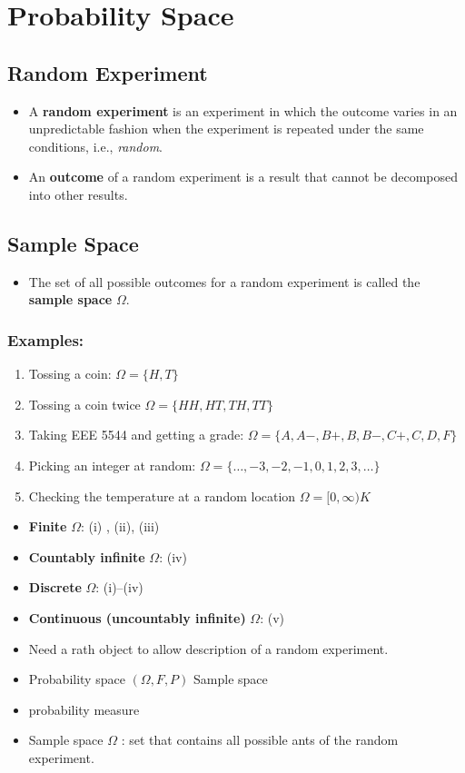 \section{Probability Space}

\subsection{Random Experiment}
\begin{itemize}
\item A \textbf{random experiment} is an experiment in which the
outcome varies in an unpredictable fashion when the experiment is
repeated under the same conditions, i.e., \emph{random}.
\item An \textbf{outcome} of a random experiment is a result that
cannot be decomposed into other results.
\end{itemize}

\subsection{Sample Space}
\begin{itemize}
\item The set of all possible outcomes for a random experiment is
called the \textbf{sample space} \(\Omega\).
\end{itemize}

\subsubsection{Examples:}
\begin{enumerate}[label=(\roman*)]
\item Tossing a coin: \(\Omega=\{H, T\}\)
\item Tossing a coin twice \(\Omega=\{H H, H T, T H, T T\}\)
\item Taking EEE 5544 and getting a grade:
\(
\Omega=\{A, A-, B+, B, B-, C+, C, D, F\}
\)
\item Picking an integer at random:
\(\Omega=\{\ldots,-3,-2,-1,0,1,2,3, \ldots \}\)
\item Checking the temperature at a random location
\(
\Omega=[0, \infty) K
\)
\end{enumerate}

\begin{itemize}
\item \textbf{Finite} \(\Omega\): (i) , (ii), (iii)
\item \textbf{Countably infinite} \(\Omega\): (iv)
\item \textbf{Discrete} \(\Omega\):  (i)--(iv)
\item \textbf{Continuous (uncountably infinite)} \(\Omega\):  (v)
\end{itemize}



\begin{itemize}
  \item[-] Need a rath object to allow description of a random experiment.
  \item[-] Probability space \((\Omega, F, P)\) Sample space
  \item[] probability measure
  \item[-] Sample space \(\Omega\) : set that contains all possible ants of the random experiment.
\end{itemize}
